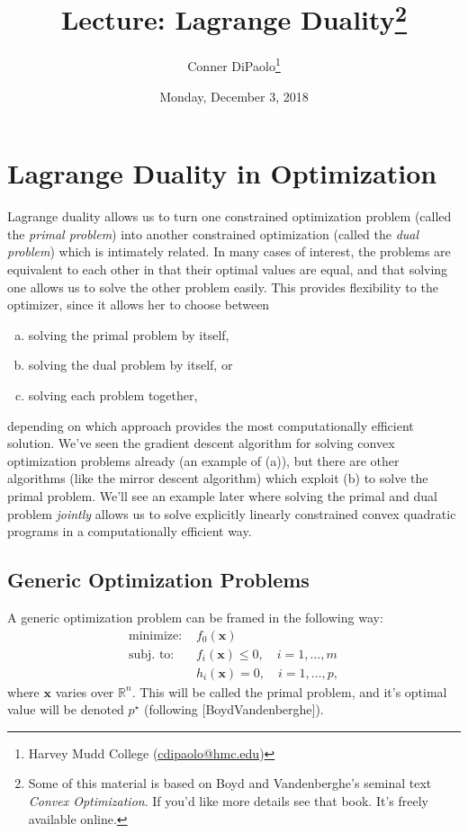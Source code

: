 \documentclass[10pt,letterpaper]{article}
\title{Lecture: Lagrange Duality\footnote{Some of this material is based on Boyd and Vandenberghe's seminal text \emph{Convex Optimization}. If you'd like more details see that book. It's freely available online.}}
\author{Conner DiPaolo\thanks{Harvey Mudd College (\url{cdipaolo@hmc.edu})}}
\date{Monday, December 3, 2018}
\theoremstyle{definition}
\theoremstyle{remark}
\newcommand\R{\mathbb{R}}
\newcommand\x{\boldsymbol{x}}
\begin{document}
\maketitle

\section{Lagrange Duality in Optimization}

Lagrange duality allows us to turn one constrained optimization problem (called the \emph{primal problem}) into another constrained optimization (called the \emph{dual problem}) which is intimately related. In many cases of interest, the problems are equivalent to each other in that their optimal values are equal, and that solving one allows us to solve the other problem easily. This provides flexibility to the optimizer, since it allows her to choose between
\begin{enumerate}[(a)]
    \item solving the primal problem by itself,
    \item solving the dual problem by itself, or
    \item solving each problem together,
\end{enumerate}
depending on which approach provides the most computationally efficient solution. We've seen the gradient descent algorithm for solving convex optimization problems already (an example of (a)), but there are other algorithms (like the mirror descent algorithm) which exploit (b) to solve the primal problem. We'll see an example later where solving the primal and dual problem \emph{jointly} allows us to solve explicitly linearly constrained convex quadratic programs in a computationally efficient way.

\subsection{Generic Optimization Problems}

A generic optimization problem can be framed in the following way:
\begin{align*}
    \text{minimize: } & f_0(\x)\\
    \text{subj. to: } & f_i(\x) \leq 0,\quad i=1,\ldots,m\\
                      & h_i(\x) = 0,\quad i=1,\ldots,p,
\end{align*}
where $\x$ varies over $\R^n$. This will be called the primal problem, and it's
optimal value will be denoted $p^\star$ (following [BoydVandenberghe]).
\end{document}
